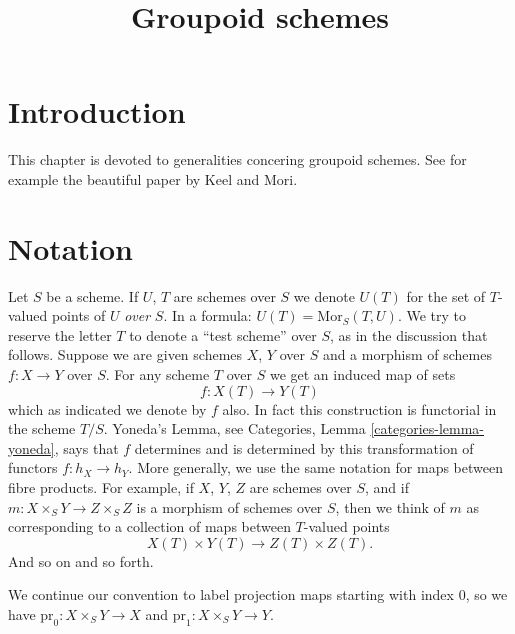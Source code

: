 

%


\title{Groupoid schemes}


\maketitle

\label{section-phantom}

\tableofcontents

\section{Introduction}
\label{section-introduction}

\noindent
This chapter is devoted to generalities concering groupoid schemes.
See for example the beautiful paper \cite{K-M} by Keel and Mori.





\section{Notation}
\label{section-notation}

\noindent
Let $S$ be a scheme. If $U$, $T$ are schemes over $S$ we denote
$U(T)$ for the set of $T$-valued points of $U$ {\it over} $S$. In a formula:
$U(T) = \text{Mor}_S(T, U)$. We try to reserve the letter $T$ to denote
a ``test scheme'' over $S$, as in the discussion that follows.
Suppose we are given schemes $X$, $Y$ over
$S$ and a morphism of schemes $f : X \to Y$ over $S$.
For any scheme $T$ over $S$ we get an induced map of sets
$$
f : X(T) \longrightarrow Y(T)
$$
which as indicated we denote by $f$ also. In fact this construction
is functorial in the scheme $T/S$. Yoneda's Lemma, see Categories,
Lemma \ref{categories-lemma-yoneda}, says that $f$ determines and is
determined by this transformation of functors $f : h_X \to h_Y$.
More generally, we use the same notation for maps between fibre
products. For example, if
$X$, $Y$, $Z$ are schemes over $S$, and if
$m : X \times_S Y \to Z \times_S Z$ is
a morphism of schemes over $S$, then we think of $m$ as corresponding
to a collection of maps between $T$-valued points
$$
X(T) \times Y(T) \longrightarrow Z(T) \times Z(T).
$$
And so on and so forth.

\medskip\noindent
We continue our convention to label projection maps starting with
index $0$, so we have $\text{pr}_0 : X \times_S Y \to X$ and
$\text{pr}_1 : X \times_S Y \to Y$.






